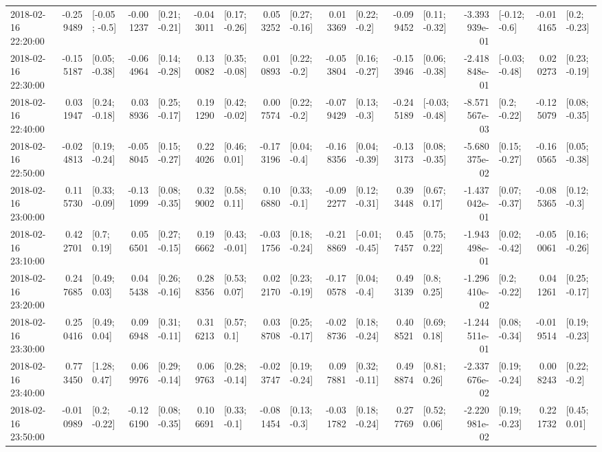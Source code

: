 \begin{tabular}{lrlrlrlrlrlrlrlrl}
2018-02-16 22:20:00 & -0.259489 &   [-0.05; -0.5] & -0.001237 &   [0.21; -0.21] & -0.043011 &   [0.17; -0.26] &  0.053252 &   [0.27; -0.16] &  0.013369 &    [0.22; -0.2] & -0.099452 &   [0.11; -0.32] & -3.393939e-01 &   [-0.12; -0.6] & -0.014165 &    [0.2; -0.23] \\
2018-02-16 22:30:00 & -0.155187 &   [0.05; -0.38] & -0.064964 &   [0.14; -0.28] &  0.130082 &   [0.35; -0.08] &  0.010893 &    [0.22; -0.2] & -0.053804 &   [0.16; -0.27] & -0.153946 &   [0.06; -0.38] & -2.418848e-01 &  [-0.03; -0.48] &  0.020273 &   [0.23; -0.19] \\
2018-02-16 22:40:00 &  0.031947 &   [0.24; -0.18] &  0.038936 &   [0.25; -0.17] &  0.191290 &   [0.42; -0.02] &  0.007574 &    [0.22; -0.2] & -0.079429 &    [0.13; -0.3] & -0.245189 &  [-0.03; -0.48] & -8.571567e-03 &    [0.2; -0.22] & -0.125079 &   [0.08; -0.35] \\
2018-02-16 22:50:00 & -0.024813 &   [0.19; -0.24] & -0.058045 &   [0.15; -0.27] &  0.224026 &    [0.46; 0.01] & -0.173196 &    [0.04; -0.4] & -0.168356 &   [0.04; -0.39] & -0.133173 &   [0.08; -0.35] & -5.680375e-02 &   [0.15; -0.27] & -0.160565 &   [0.05; -0.38] \\
2018-02-16 23:00:00 &  0.115730 &   [0.33; -0.09] & -0.131099 &   [0.08; -0.35] &  0.329002 &    [0.58; 0.11] &  0.106880 &    [0.33; -0.1] & -0.092277 &   [0.12; -0.31] &  0.393448 &    [0.67; 0.17] & -1.437042e-01 &   [0.07; -0.37] & -0.085365 &    [0.12; -0.3] \\
2018-02-16 23:10:00 &  0.422701 &     [0.7; 0.19] &  0.056501 &   [0.27; -0.15] &  0.196662 &   [0.43; -0.01] & -0.031756 &   [0.18; -0.24] & -0.218869 &  [-0.01; -0.45] &  0.457457 &    [0.75; 0.22] & -1.943498e-01 &   [0.02; -0.42] & -0.050061 &   [0.16; -0.26] \\
2018-02-16 23:20:00 &  0.247685 &    [0.49; 0.03] &  0.045438 &   [0.26; -0.16] &  0.288356 &    [0.53; 0.07] &  0.022170 &   [0.23; -0.19] & -0.170578 &    [0.04; -0.4] &  0.493139 &     [0.8; 0.25] & -1.296410e-02 &    [0.2; -0.22] &  0.041261 &   [0.25; -0.17] \\
2018-02-16 23:30:00 &  0.250416 &    [0.49; 0.04] &  0.096948 &   [0.31; -0.11] &  0.316213 &     [0.57; 0.1] &  0.038708 &   [0.25; -0.17] & -0.028736 &   [0.18; -0.24] &  0.408521 &    [0.69; 0.18] & -1.244511e-01 &   [0.08; -0.34] & -0.019514 &   [0.19; -0.23] \\
2018-02-16 23:40:00 &  0.773450 &    [1.28; 0.47] &  0.069976 &   [0.29; -0.14] &  0.069763 &   [0.28; -0.14] & -0.023747 &   [0.19; -0.24] &  0.097881 &   [0.32; -0.11] &  0.498874 &    [0.81; 0.26] & -2.337676e-02 &   [0.19; -0.24] &  0.008243 &    [0.22; -0.2] \\
2018-02-16 23:50:00 & -0.010989 &    [0.2; -0.22] & -0.126190 &   [0.08; -0.35] &  0.106691 &    [0.33; -0.1] & -0.081454 &    [0.13; -0.3] & -0.031782 &   [0.18; -0.24] &  0.277769 &    [0.52; 0.06] & -2.220981e-02 &   [0.19; -0.23] &  0.221732 &    [0.45; 0.01] \\
\bottomrule
\end{tabular}
